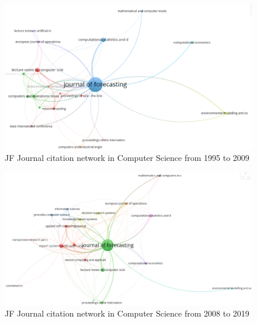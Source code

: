 \documentclass[11pt,a4paper]{elsarticle} %
\begin{document}
\begin{figure}[htbp]
\centering
\includegraphics[scale=0.3]{fig.21.eps}
\caption{JF Journal citation network in Computer Science from 1995 to 2009}
\end{figure}

\begin{figure}[htbp]
\centering
\includegraphics[scale=0.3]{fig.22.eps}
\caption{JF Journal citation network in Computer Science from 2008 to 2019  }
\end{figure}
\end{document}

